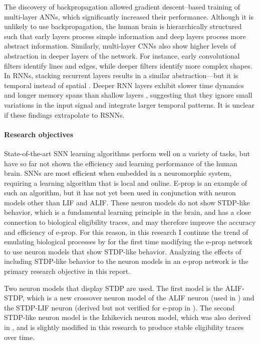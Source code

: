 	The discovery of backpropagation allowed gradient descent--based training of multi-layer ANNs, which significantly increased their performance.
	Although it is unlikely to use backpropagation, the human brain is hierarchically structured such that early layers process simple information and deep layers process more abstract information.
	Similarly, multi-layer CNNs also show higher levels of abstraction in deeper layers of the network.
	For instance, early convolutional filters identify lines and edges, while deeper filters identify more complex shapes.
	In RNNs, stacking recurrent layers results in a similar abstraction---but it is temporal instead of spatial \citep{hermans2013training,gallicchio2017deep}.
	Deeper RNN layers exhibit slower time dynamics and longer memory spans than shallow layers \citep{gallicchio2018short}, suggesting that they ignore small variations in the input signal and integrate larger temporal patterns.
	It is unclear if these findings extrapolate to RSNNs.

\paragraph{Research objectives}
	State-of-the-art SNN learning algorithms perform well on a variety of tasks, but have so far not shown the efficiency and learning performance of the human brain.
	SNNs are most efficient when embedded in a neuromorphic system, requiring a learning algorithm that is local and online.
	E-prop is an example of such an algorithm, but it has not yet been used in conjunction with neuron models other than LIF and ALIF.
	These neuron models do not show STDP-like behavior, which is a fundamental learning principle in the brain, and has a close connection to biological eligibility traces, and may therefore improve the accuracy and efficiency of e-prop.
	For this reason, in this research I continue the trend of emulating biological processes by for the first time modifying the e-prop network to use neuron models that show STDP-like behavior.
	Analyzing the effects of including STDP-like behavior to the neuron models in an e-prop network is the primary research objective in this report.

	Two neuron models that display STDP are used.
	The first model is the ALIF-STDP, which is a new crossover neuron model of the ALIF neuron (used in \citet{bellec2020solution}) and the STDP-LIF neuron (derived but not verified for e-prop in \citet{traub2020learning}).
	The second STDP-like neuron model is the Izhikevich neuron model, which was also derived in \citet{traub2020learning}, and is slightly modified in this research to produce stable eligibility traces over time.

